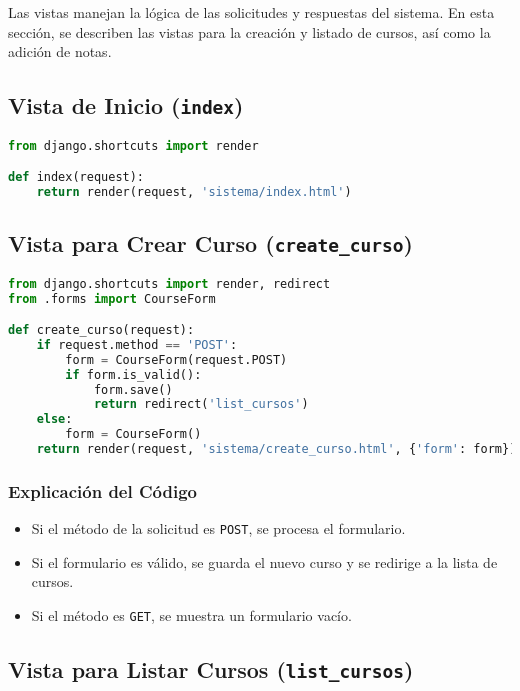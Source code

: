 Las vistas manejan la lógica de las solicitudes y respuestas del sistema. En esta sección, se describen las vistas para la creación y listado de cursos, así como la adición de notas.

\subsection{Vista de Inicio (\texttt{index})}

\begin{lstlisting}[language=Python, caption=Vista de Inicio]
from django.shortcuts import render

def index(request):
    return render(request, 'sistema/index.html')
\end{lstlisting}

\subsection{Vista para Crear Curso (\texttt{create\_curso})}

\begin{lstlisting}[language=Python, caption=Vista para Crear Curso]
from django.shortcuts import render, redirect
from .forms import CourseForm

def create_curso(request):
    if request.method == 'POST':
        form = CourseForm(request.POST)
        if form.is_valid():
            form.save()
            return redirect('list_cursos')
    else:
        form = CourseForm()
    return render(request, 'sistema/create_curso.html', {'form': form})
\end{lstlisting}

\subsubsection{Explicación del Código}

\begin{itemize}
    \item Si el método de la solicitud es \texttt{POST}, se procesa el formulario.
    \item Si el formulario es válido, se guarda el nuevo curso y se redirige a la lista de cursos.
    \item Si el método es \texttt{GET}, se muestra un formulario vacío.
\end{itemize}

\subsection{Vista para Listar Cursos (\texttt{list\_cursos})}

